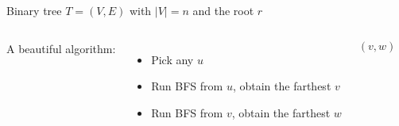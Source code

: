 \begin{frame}{}
  \centerline{Binary tree $T = (V, E)$ with $|V| = n$ and the root $r$}

  \pause
  \vspace{0.80cm}
  \centerline{}

  \pause
\end{frame}

\begin{frame}{}
  \centerline{}

  \pause
  \vspace{0.80cm}
  \begin{columns}
      {\large A beautiful algorithm:}
      \begin{itemize}
	\item Pick any $u$
	\item Run BFS from $u$, obtain the farthest $v$
	\item Run BFS from $v$, obtain the farthest $w$
      \end{itemize}
      \[
	(v, w)
      \]
    \pause
      \centerline{}
  \end{columns}

  \pause
  \vspace{0.50cm}
  \centerline{}
\end{frame}


% 
